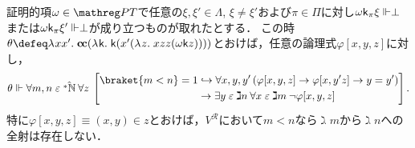 \documentclass[realisability.tex]{subfiles}
\begin{document}
\begin{lemma}\label{lem:gimel-n-incr}
 証明的項$\omega \in \PT$で任意の$\xi, \xi' \in \Lambda$, $\xi \neq \xi'$および$\pi \in \Pi$に対し$\omega \mathsf{k}_\pi \xi \Vdash \perp$または$\omega\mathsf{k}_\pi \xi' \Vdash \perp$が成り立つものが取れたとする．
 この時$\theta \defeq \abs{x x'}{\cc (\abs{\conti}{\conti (x'(\abs{z}{xzz(\omega \conti z)}))})}$とおけば，任意の論理式$\varphi[x,y,z]$に対し，
 \[
  \theta \Vdash \forall m, n \strin \hat{\NN}\: \forall z \:
   \left[\begin{split}
          \braket{m < n} = 1 &\hookrightarrow
          \forall x, y, y' \left( \varphi[x,y,z] \to \varphi[x, y' z] \to y = y'\right)\\
         &\to \exists y \strin \gimel n \: \forall x \strin \gimel m \: \neg \varphi[x,y,z]
  \end{split}\right].
 \]
 特に$\varphi[x, y, z] \equiv (x, y) \in z$とおけば，$V^{\mathcal{R}}$において$m < n$なら$\gimel m$から$\gimel n$への全射は存在しない．
\end{lemma}
\end{document}
